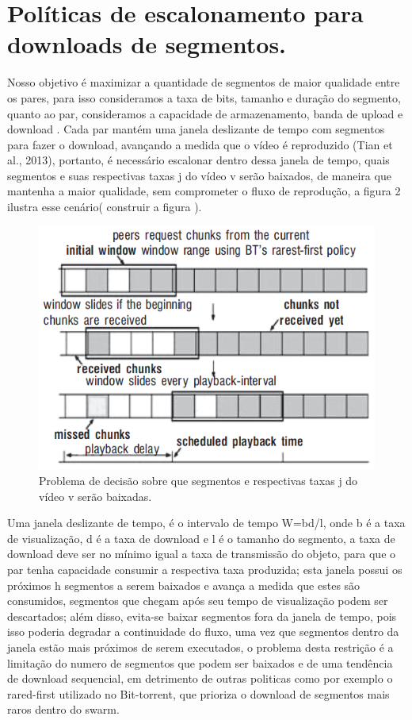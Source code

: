 \documentclass[
	12pt,				%
	oneside,			%
	a4paper,			%
	english,			%
	brazil				%
	]{abntex2ppgsi}
\begin{document}
\section{Políticas de escalonamento para downloads de segmentos.}

Nosso objetivo é maximizar a quantidade de segmentos de maior qualidade entre os pares, para isso consideramos a taxa de bits, tamanho e duração do segmento, quanto ao par, consideramos a capacidade de armazenamento, banda de upload e download . Cada par mantém uma janela deslizante de tempo com segmentos para fazer o download, avançando a medida que o vídeo é reproduzido (Tian et al., 2013), portanto, é necessário escalonar dentro dessa janela de tempo, quais segmentos e suas respectivas taxas j do vídeo v serão baixados, de maneira que mantenha a maior qualidade, sem comprometer o fluxo de reprodução, a figura 2 ilustra esse cenário( construir a figura ).

\begin{figure}[H]%
	\centering
 	  \caption{Problema de decisão sobre que segmentos e respectivas taxas j do vídeo v serão baixadas.}
		\includegraphics{figuras/janeladetempo.png}
\end{figure}

Uma janela deslizante de tempo, é o intervalo de tempo W=bd/l, onde b é a taxa de visualização, d é a taxa de download e l é o tamanho do segmento, a taxa de download deve ser no mínimo igual a taxa de transmissão do objeto, para que o par tenha capacidade consumir a respectiva taxa produzida; esta janela possui os próximos h segmentos a serem baixados e avança a medida que estes são consumidos, segmentos que chegam após seu tempo de visualização podem ser descartados; além disso, evita-se baixar segmentos fora da janela de tempo, pois isso poderia degradar a continuidade do fluxo, uma vez que segmentos dentro da janela estão mais próximos de serem executados,  o problema desta restrição é a limitação do numero de segmentos que podem ser baixados e de uma tendência de download sequencial, em detrimento de outras politicas como por exemplo o rared-first utilizado no Bit-torrent, que prioriza o download de segmentos mais raros dentro do swarm.
\end{document}
